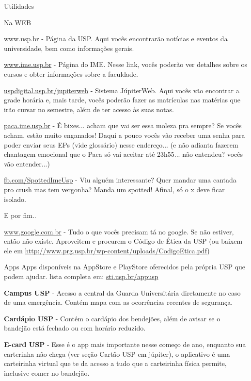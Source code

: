 \begin{secao}{Utilidades}

\begin{subsecao}{Na WEB}

\url{ www.usp.br} - Página da USP. Aqui vocês encontrarão notícias e eventos da
universidade, bem como informações gerais.

\url{ www.ime.usp.br} - Página do IME.
Nesse link, vocês poderão ver detalhes sobre os cursos e obter informações sobre
a faculdade.

\url{ uspdigital.usp.br/jupiterweb} - Sistema JúpiterWeb. Aqui vocês vão
encontrar a grade horária e, mais tarde, vocês poderão fazer as matrículas nas
matérias que irão cursar no semestre, além de ter acesso às suas notas.

\url{ paca.ime.usp.br} - É bixes... acham que vai ser essa moleza pra sempre? Se
vocês acham, estão muito enganados! Daqui a pouco vocês vão receber uma senha para
poder enviar seus EPs (vide glossário) nesse endereço... (e não adianta fazerem
chantagem emocional que o Paca só vai aceitar até 23h55... não entendeu? vocês
vão entender...)

\url{ fb.com/SpottedImeUsp} - Viu alguém interessante? Quer mandar uma cantada
pro crush mas tem vergonha? Manda um spotted! Afinal, só o x deve ficar isolado.


E por fim..

\url{ www.google.com.br} - Tudo o que vocês precisam tá no google. Se não estiver,
então não existe. Aproveitem e procurem o Código de Ética da USP (ou baixem ele em
\url{http://www.prg.usp.br/wp-content/uploads/CodigoEtica.pdf})

\end{subsecao}

\begin{subsecao}{Apps}
Apps disponíveis na AppStore e PlayStore oferecidos pela própria USP que podem ajudar. lista completa em: \url{sti.usp.br/appusp}

{\bf Campus USP} - Acesso a central da Guarda Universitária diretamente no caso de uma emergência. Contém mapa com as ocorrências recentes de segurança. 

{\bf Cardápio USP} - Contém o cardápio dos bendejões, além de avisar se o bandejão está fechado ou com horário reduzido.

{\bf E-card USP} - Esse é o app mais importante nesse começo de ano, enquanto sua carterinha não chega (ver seção Cartão USP em júpiter), o aplicativo é uma carteirinha virtual que te da acesso a tudo que a carteirinha física permite, inclusive comer no bandejão.


\end{subsecao}
\end{secao}
